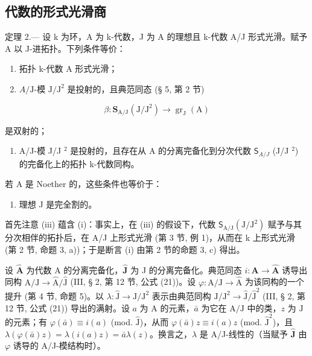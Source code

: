 \subsection{代数的形式光滑商}

定理 2.--- 设 k 为环，A 为 k-代数，J 为 A 的理想且 k-代数 A/J 形式光滑。赋予 A 以 J-进拓扑。下列条件等价：

\begin{enumerate}
\def\labelenumi{(\roman{enumi})}
\item
  拓扑 k-代数 A 形式光滑；
\item
  \(A/\mathrm{J}\)-模 \(\mathrm{J}/\mathrm{J}^2\) 是投射的，且典范同态 (§ 5, 第 2 节)
\end{enumerate}

\[
\beta : \mathbf {S} _ {\mathrm{A/J}} (\mathrm{J} / \mathrm{J} ^ {2}) \rightarrow \operatorname{gr} _ {\mathrm{J}} (\mathrm{A})
\]

是双射的；

\begin{enumerate}
\def\labelenumi{(\roman{enumi})}
\setcounter{enumi}{2}
\tightlist
\item
  A/J-模 J/J \(^{2}\) 是投射的，且存在从 A 的分离完备化到分次代数 \(\mathsf{S}_{A/J}\) (J/J \(^{2}\)) 的完备化上的拓扑 k-代数同构。
\end{enumerate}

若 A 是 Noether 的，这些条件也等价于：

\begin{enumerate}
\def\labelenumi{(\roman{enumi})}
\setcounter{enumi}{3}
\tightlist
\item
  理想 J 是完全割的。
\end{enumerate}

首先注意 (iii) 蕴含 (i)：事实上，在 (iii) 的假设下，代数 \(\mathsf{S}_{\mathrm{A}/\mathrm{J}}(\mathrm{J}/\mathrm{J}^{2})\) 赋予与其分次相伴的拓扑后，在 A/J 上形式光滑 (第 3 节, 例 1)，从而在 k 上形式光滑 (第 2 节, 命题 3, a))；于是断言 (i) 由第 2 节的命题 3, c) 得出。

设 \(\widehat{\mathbf{A}}\) 为代数 A 的分离完备化，\(\widehat{\mathbf{J}}\) 为 J 的分离完备化。典范同态 \(i: \mathbf{A} \to \widehat{\mathbf{A}}\) 诱导出同构 \(\mathrm{A} / \mathrm{J} \longrightarrow \widehat{\mathrm{A}} / \widehat{\mathrm{J}}\) (III, § 2, 第 12 节, 公式 (21))。设 \(\varphi: \mathrm{A} / \mathrm{J} \to \widehat{\mathrm{A}}\) 为该同构的一个提升 (第 4 节, 命题 5)。以 \(\lambda: \widehat{\mathrm{J}} \to \mathrm{J} / \mathrm{J}^2\) 表示由典范同构 \(\mathrm{J} / \mathrm{J}^2 \longrightarrow \widehat{\mathrm{J}} / \widehat{\mathrm{J}}^2\) (III, § 2, 第 12 节, 公式 (21)) 导出的满射。设 \(a\) 为 A 的元素，\(\bar{a}\) 为它在 \(\mathrm{A} / \mathrm{J}\) 中的类，\(z\) 为 \(\widehat{\mathrm{J}}\) 的元素；有 \(\varphi(\bar{a}) \equiv i(a)\) (mod. \(\widehat{\mathrm{J}}\))，从而 \(\varphi(\bar{a})z \equiv i(a)z\) (mod. \(\widehat{\mathrm{J}}^2\))，且 \(\lambda(\varphi(\bar{a})z) = \lambda(i(a)z) = \bar{a}\lambda(z)\)。换言之，\(\lambda\) 是 A/J-线性的（当赋予 \(\widehat{\mathbf{J}}\) 由 \(\varphi\) 诱导的 A/J-模结构时）。

